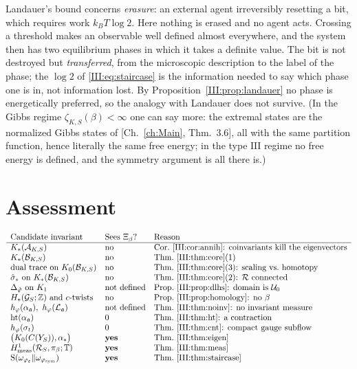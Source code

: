 \begin{remark}\label{III:rem:landauer}
Landauer's bound concerns \emph{erasure}: an external agent irreversibly resetting a bit,
which requires work $k_BT\log2$. Here nothing is erased and no agent acts. Crossing a
threshold makes an observable well defined almost everywhere, and the system then has two
equilibrium phases in which it takes a definite value. The bit is not destroyed but
\emph{transferred}, from the microscopic description to the label of the phase; the $\log2$
of \eqref{III:eq:staircase} is the information needed to say which phase one is in, not
information lost. By Proposition~\ref{III:prop:landauer} no phase is energetically preferred,
so the analogy with Landauer does not survive. (In the Gibbs regime $\zeta_{K,S}(\beta)<\infty$
one can say more: the extremal states are the normalized Gibbs states of [Ch.~\ref{ch:Main}, Thm.~3.6],
all with the same partition function, hence literally the same free energy; in the type
$\mathrm{III}$ regime no free energy is defined, and the symmetry argument is all there is.)
\end{remark}

\section{Assessment}

\[
\begin{array}{lll}
\text{Candidate invariant} & \text{Sees }\Xi_\beta? & \text{Reason}\\\hline
K_*(\mathcal{A}_{K,S}) & \text{no} & \text{Cor.~\ref{III:cor:annih}: coinvariants kill the eigenvectors}\\
K_*(\mathcal{B}_{K,S}) & \text{no} & \text{Thm.~\ref{III:thm:core}(1)}\\
\text{dual trace on }K_0(\mathcal{B}_{K,S}) & \text{no} & \text{Thm.~\ref{III:thm:core}(3): scaling vs.\ homotopy}\\
\hat\sigma_*\ \text{on}\ K_*(\mathcal{B}_{K,S}) & \text{no} & \text{Thm.~\ref{III:thm:core}(2): }\mathcal{R}\ \text{connected}\\
\Delta_{\hat\varphi}\ \text{on}\ K_1 & \text{not defined} & \text{Prop.~\ref{III:prop:dlhs}: domain is }\mathcal{U}_0\\
H_*(\mathcal{G}_S;\mathbb{Z})\ \text{and }c\text{-twists} & \text{no} & \text{Prop.~\ref{III:prop:homology}: no }\beta\\
h_\varphi(\alpha_{\mathfrak{a}}),\ h_\varphi(\mathcal{L}_{\mathfrak{a}}) & \text{not defined} & \text{Thm.~\ref{III:thm:noinv}: no invariant measure}\\
\mathrm{ht}(\alpha_{\mathfrak{a}}) & 0 & \text{Thm.~\ref{III:thm:ht}: a contraction}\\
h_\varphi(\sigma_t) & 0 & \text{Thm.~\ref{III:thm:cnt}: compact gauge subflow}\\
\bigl(K_0(C(Y_S)),\alpha_*\bigr) & \textbf{yes} & \text{Thm.~\ref{III:thm:eigen}}\\
H^1_{\mathrm{meas}}(\mathcal{R}_S,\pi_\beta;\mathbb{T}) & \textbf{yes} & \text{Thm.~\ref{III:thm:meas}}\\
\mathrm{S}(\omega_{\varphi_\varepsilon}\|\omega_{\varphi_{\mathrm{sym}}}) & \textbf{yes} & \text{Thm.~\ref{III:thm:staircase}}
\end{array}
\]

